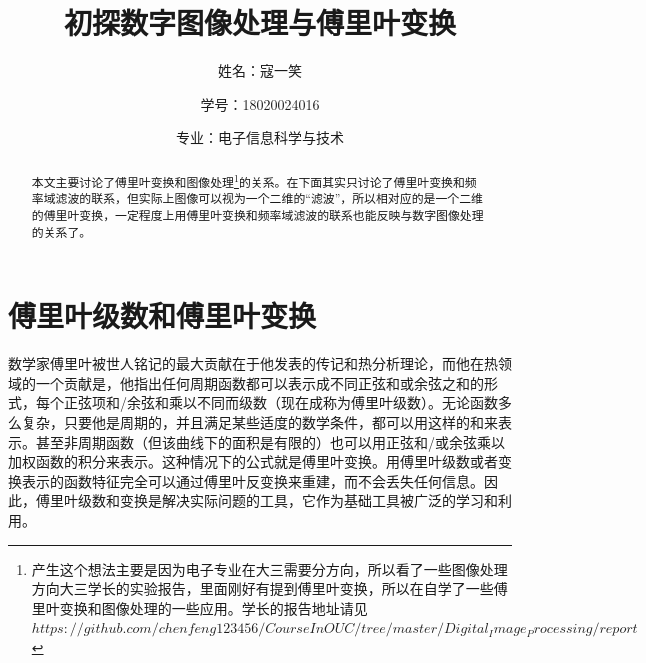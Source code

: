 \documentclass[UTF8,a4paper]{ctexart}
\title{初探数字图像处理与傅里叶变换}
\author{姓名：寇一笑 \protect\newline
\and 学号：18020024016 \\
\and 专业：电子信息科学与技术}
\begin{document}
\maketitle
\newcommand\blfootnote[1]{%
\begingroup
\renewcommand\thefootnote{}\footnote{#1}%
\addtocounter{footnote}{-1}%
\endgroup
}%
\begin{abstract}
  本文主要讨论了傅里叶变换和图像处理\footnote{产生这个想法主要是因为电子专业在大三需要分方向，所以看了一些图像处理方向大三学长的实验报告，里面刚好有提到傅里叶变换，所以在自学了一些傅里叶变换和图像处理的一些应用。学长的报告地址请见$https://github.com/chenfeng123456/CourseInOUC/tree/master/Digital_Image_Processing/report$}的关系。在下面其实只讨论了傅里叶变换和频率域滤波的联系，但实际上图像可以视为一个二维的“滤波”，所以相对应的是一个二维的傅里叶变换，一定程度上用傅里叶变换和频率域滤波的联系也能反映与数字图像处理的关系了。
\end{abstract}
 
 \section{傅里叶级数和傅里叶变换}
 数学家傅里叶被世人铭记的最大贡献在于他发表的传记和热分析理论，而他在热领域的一个贡献是，他指出任何周期函数都可以表示成不同正弦和或余弦之和的形式，每个正弦项和/余弦和乘以不同而级数（现在成称为傅里叶级数）。无论函数多么复杂，只要他是周期的，并且满足某些适度的数学条件，都可以用这样的和来表示。甚至非周期函数（但该曲线下的面积是有限的）也可以用正弦和/或余弦乘以加权函数的积分来表示。这种情况下的公式就是傅里叶变换。用傅里叶级数或者变换表示的函数特征完全可以通过傅里叶反变换来重建，而不会丢失任何信息。因此，傅里叶级数和变换是解决实际问题的工具，它作为基础工具被广泛的学习和利用。\par
%
\end{document}
